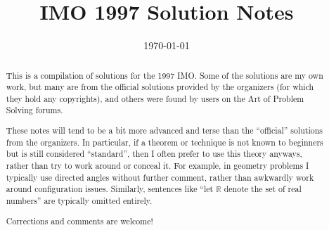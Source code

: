 \documentclass[11pt]{scrartcl}
\title{IMO 1997 Solution Notes}
\date{\today}
\begin{document}
\maketitle

\begin{abstract}
This is a compilation of solutions
for the 1997 IMO.
Some of the solutions are my own work,
but many are from the official solutions provided by the organizers
(for which they hold any copyrights),
and others were found by users on the Art of Problem Solving forums.

These notes will tend to be a bit more advanced and terse than the ``official''
solutions from the organizers.
In particular, if a theorem or technique is not known to beginners
but is still considered ``standard'', then I often prefer to
use this theory anyways, rather than try to work around or conceal it.
For example, in geometry problems I typically use directed angles
without further comment, rather than awkwardly work around configuration issues.
Similarly, sentences like ``let $\mathbb{R}$ denote the set of real numbers''
are typically omitted entirely.

Corrections and comments are welcome!
\end{abstract}

\tableofcontents
\newpage

\addtocounter{section}{-1}
\end{document}
